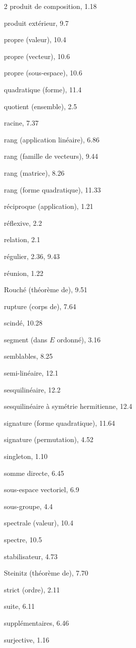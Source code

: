 \begin{multicols}{2}
produit de composition, 1.18

produit extérieur, 9.7


propre (valeur), 10.4

propre (vecteur), 10.6

propre (sous-espace), 10.6

\medskip
quadratique (forme), 11.4

quotient (ensemble), 2.5

\medskip
racine, 7.37

rang (application linéaire), 6.86

rang (famille de vecteurs), 9.44

rang (matrice), 8.26

rang (forme quadratique), 11.33

réciproque (application), 1.21

réflexive, 2.2

relation, 2.1

régulier, 2.36, 9.43

réunion, 1.22

Rouché (théorème de), 9.51

rupture (corps de), 7.64

\medskip
scindé, 10.28

segment (dans $E$ ordonné), 3.16

semblables, 8.25

semi-linéaire, 12.1

sesquilinéaire, 12.2

sesquilinéaire à symétrie hermitienne, 12.4

signature (forme quadratique), 11.64

signature (permutation), 4.52

singleton, 1.10

somme directe, 6.45

sous-espace vectoriel, 6.9

sous-groupe, 4.4

spectrale (valeur), 10.4

spectre, 10.5

stabilisateur, 4.73

Steinitz (théorème de), 7.70

strict (ordre), 2.11

suite, 6.11

supplémentaires, 6.46

surjective, 1.16


\end{multicols}
